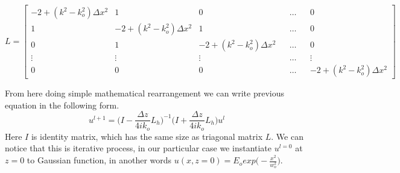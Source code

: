 \documentclass{article}
\begin{document}
	\setlength\arraycolsep{-2.5pt}
	\[ L = \begin{bmatrix}
    -2+(k^2-k_o^2)\Delta x^2& 1& 0& &\dots& & 0 \\
    1 & -2+(k^2-k_o^2)\Delta x^2 & 1& &\dots& & 0 \\
    0 &     1& -2+(k^2-k_o^2)\Delta x^2 & &\dots& & 0 \\
    \vdots & \vdots & \vdots & &\dots& & \vdots \\
    0& 0& 0& &\dots& &     -2+(k^2-k_o^2)\Delta x^2
	\end{bmatrix}\]
	
	
	From here doing simple mathematical rearrangement we can write previous equation in the following form.
		\[u^{l+1} = \bigg(I-\frac{\Delta z}{4ik_o}L_h\bigg)^{-1}\bigg(I+\frac{\Delta z}{4ik_o}L_h\bigg) u^l\]
	Here $I$ is identity matrix, which has the same size as triagonal matrix $L$. We can notice that this is iterative process, in our particular case we instantiate $u^{l=0}$ at $z = 0$ to Gaussian function, in another words $u(x,z=0)= E_oexp\big(-\frac{x^2}{w_o^2}\big)$.
	
\end{document}

